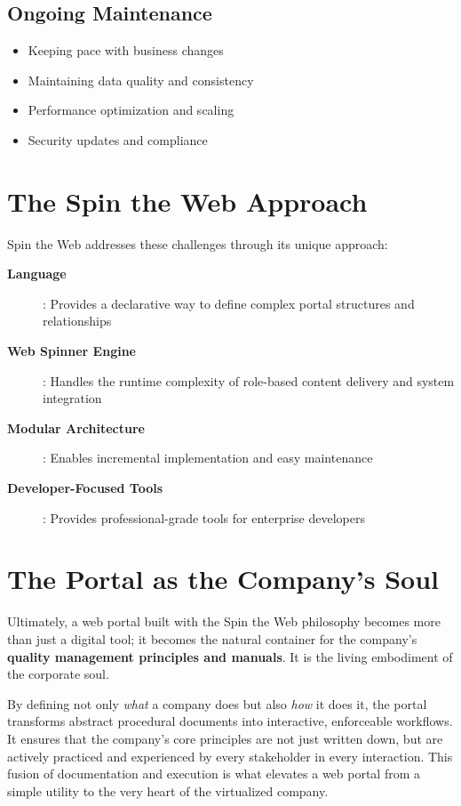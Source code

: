 \subsection{Ongoing Maintenance}

\begin{itemize}
	\item Keeping pace with business changes
	\item Maintaining data quality and consistency
	\item Performance optimization and scaling
	\item Security updates and compliance
\end{itemize}

\section{The Spin the Web Approach}
\label{sec:spin-approach}

Spin the Web addresses these challenges through its unique approach:

\begin{description}
\item[\textbf{\wbdl{} Language}]: Provides a declarative way to define complex portal structures and relationships
\item[\textbf{Web Spinner Engine}]: Handles the runtime complexity of role-based content delivery and system integration
\item[\textbf{Modular Architecture}]: Enables incremental implementation and easy maintenance
\item[\textbf{Developer-Focused Tools}]: Provides professional-grade tools for enterprise developers
\end{description}

\section{The Portal as the Company's Soul}
\label{sec:portal-soul}

Ultimately, a web portal built with the Spin the Web philosophy becomes more than just a digital tool; it becomes the natural container for the company's \textbf{quality management principles and manuals}. It is the living embodiment of the corporate soul.

By defining not only \textit{what} a company does but also \textit{how} it does it, the portal transforms abstract procedural documents into interactive, enforceable workflows. It ensures that the company's core principles are not just written down, but are actively practiced and experienced by every stakeholder in every interaction. This fusion of documentation and execution is what elevates a web portal from a simple utility to the very heart of the virtualized company.
